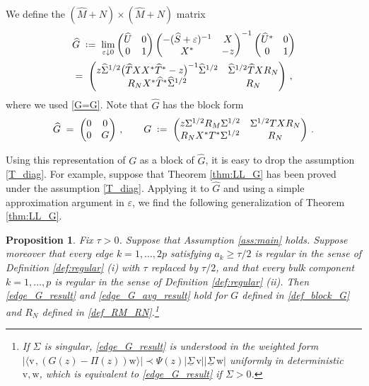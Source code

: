\documentclass[11pt]{article} %
\numberwithin{equation}{section}
\numberwithin{figure}{section}
\theoremstyle{plain} %
\newtheorem{proposition}[theorem]{Proposition}
\theoremstyle{definition} %
\newcommand{\f}[1]{\boldsymbol{\mathrm{#1}}} %
\newcommand{\ul}[1]{\underline{#1} \!\,} %
\newcommand{\wh}{\widehat}
\newcommand*{\deq}{\mathrel{\vcenter{\baselineskip0.65ex \lineskiplimit0pt \hbox{.}\hbox{.}}}=}
\renewcommand{\geq}{\geqslant}
\renewcommand{\epsilon}{\varepsilon}
\newcommand{\pb}[1]{\bigl({#1}\bigr)}
\newcommand{\abs}[1]{\lvert #1 \rvert}
\newcommand{\scalar}[2]{\langle{#1} \mspace{2mu}, {#2}\rangle}
\begin{document}
We define the $(\wh M + N) \times (\wh M + N)$ matrix
\begin{multline*}
\wh G \;\deq\; \lim_{\epsilon \downarrow 0} \begin{pmatrix}
\wh U & 0 \\ 0 & 1
\end{pmatrix}
\begin{pmatrix}
-(\wh S + \epsilon)^{-1} & X \\ X^* & -z
\end{pmatrix}^{-1}
\begin{pmatrix}
\wh U^* & 0 \\ 0 & 1
\end{pmatrix}
\\
=\;
\begin{pmatrix}
z \wh \Sigma^{1/2} \pb{\wh T X X^* \wh T^* - z}^{-1} \wh \Sigma^{1/2} & \wh \Sigma^{1/2} \wh T X R_N
\\
R_N X^* \wh T^* \wh \Sigma^{1/2} & R_N
\end{pmatrix}\,,
\end{multline*}
where we used \eqref{G=G}. Note that $\wh G$ has the block form
\begin{equation} \label{def_block_G}
\wh G \;=\;
\begin{pmatrix}
0 & 0
\\ 0 & G
\end{pmatrix}\,, \qquad
G \;\deq\; \begin{pmatrix}
z \Sigma^{1/2} R_M \Sigma^{1/2} & \Sigma^{1/2} T X R_N
\\
R_N X^* T^* \Sigma^{1/2} & R_N
\end{pmatrix}\,.
\end{equation}

Using this representation of $G$ as a block of $\wh G$, it is easy to drop the assumption \eqref{T_diag}. For example, 
suppose that Theorem \ref{thm:LL_G} has been proved under the assumption \eqref{T_diag}. Applying it to $\wh G$ and using a simple approximation argument in $\epsilon$, we find the following generalization of Theorem \ref{thm:LL_G}.

\begin{proposition}
Fix $\tau > 0$. Suppose that Assumption \ref{ass:main} holds. Suppose moreover that every edge $k = 1, \dots, 2p$ satisfying $a_k \geq \tau/2$ is regular in the sense of Definition \ref{def:regular} (i) with $\tau$ replaced by $\tau/2$, and that every bulk component $k = 1, \dots, p$ is regular in the sense of Definition \ref{def:regular} (ii). Then \eqref{edge_G_result} and \eqref{edge_G_avg_result} hold for $G$ defined in \eqref{def_block_G} and $R_N$ defined in \eqref{def_RM_RN}.\footnote{If $\Sigma$ is singular, \eqref{edge_G_result} is understood in the weighted form $\abs{\scalar{\f v}{(G(z) - \Pi(z)) \f w}} \prec \Psi(z) \abs{\ul \Sigma \f v} \abs{\ul \Sigma \f w}$ uniformly in deterministic $\f v, \f w$, which is equivalent to \eqref{edge_G_result} if $\Sigma > 0$.}
\end{proposition}
\end{document}
